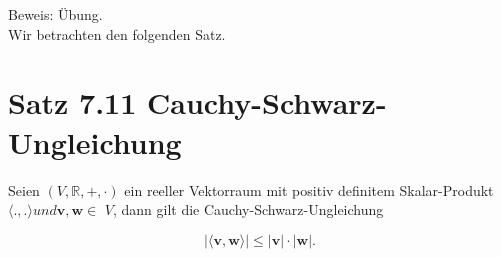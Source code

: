 \documentclass[10pt]{article}
\begin{document}
Beweis: Übung.\\
Wir betrachten den folgenden Satz.

\section*{Satz 7.11 Cauchy-Schwarz-Ungleichung}
Seien $(V, \mathbb{R},+, \cdot)$ ein reeller Vektorraum mit positiv definitem Skalar-Produkt $\langle.,$.$\rangle und \mathbf{v}, \mathbf{w} \in$ $V$, dann gilt die Cauchy-Schwarz-Ungleichung


\begin{equation*}
|\langle\mathbf{v}, \mathbf{w}\rangle| \leq|\mathbf{v}| \cdot|\mathbf{w}| . \tag{7.77}
\end{equation*}
\end{document}
